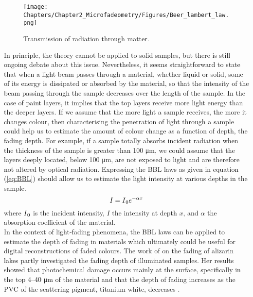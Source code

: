 \begin{figure}
\centering
\texttt{[image: Chapters/Chapter2\_Microfadeometry/Figures/Beer\_lambert\_law.png]}
\caption[\hspace{0.3cm}Transmission of radiation through matter]{Transmission of radiation through matter.}
\label{fig:Laws_BBL}
\end{figure}


In principle, the theory cannot be applied to solid samples, but there is still ongoing debate about this issue. Nevertheless, it seems straightforward to state that when a light beam passes through a material, whether liquid or solid, some of its energy is dissipated or absorbed by the material, so that the intensity of the beam passing through the sample decreases over the length of the sample. In the case of paint layers, it implies that the top layers receive more light energy than the deeper layers. If we assume that the more light a sample receives, the more it changes colour, then characterising the penetration of light through a sample could help us to estimate the amount of colour change as a function of depth, \ie the fading depth. For example, if a sample totally absorbs incident radiation when the thickness of the sample is greater than 100 \unit{\um}, we could assume that the layers deeply located, \ie below 100 \unit{\um}, are not exposed to light and are therefore not altered by optical radiation. Expressing the \gls{BBL} laws as given in equation (\ref{eq:BBL}) \citep[56, eq. 5.8]{feller_accelerated_1994} should allow us to estimate the light intensity at various depths in the sample. \\

\begin{equation}
    I = I\textsubscript{0}e^{-\alpha x}
\label{eq:BBL}
\end{equation}
where $I\textsubscript{0}$ is the incident intensity, $I$ the intensity at depth $x$, and $\alpha$ the absorption coefficient of the material.\\

In the context of light-fading phenomena, the \gls{BBL} laws can be applied to estimate the depth of fading in materials \citep[56]{feller_accelerated_1994} which ultimately could be useful for digital reconstructions of faded colours. The work of \citet{johnston-feller_reflections_1986} on the fading of alizarin lakes partly investigated the fading depth of illuminated samples. Her results showed that photochemical damage occurs mainly at the surface, specifically in the top 4–40 \unit{\um} of the material \citep[39]{johnston-feller_reflections_1986} and that the depth of fading increases as the \gls{PVC} of the scattering pigment, titanium white, decreases \citep[39-40]{johnston-feller_reflections_1986}.\\


